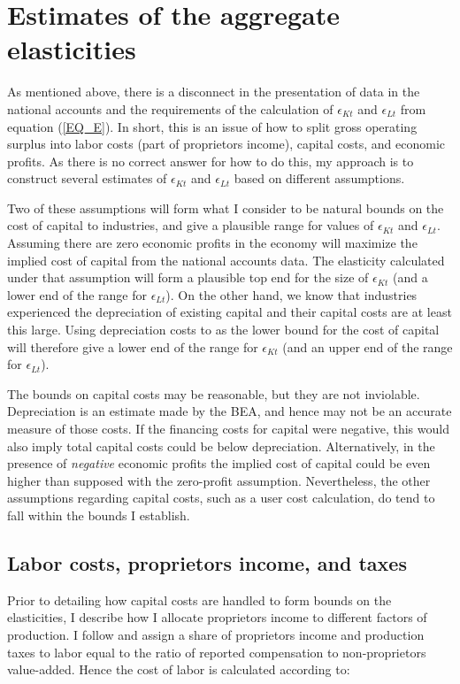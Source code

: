\documentclass[11pt]{article}
\begin{document}
\section{Estimates of the aggregate elasticities}\label{SEC_bounding}
As mentioned above, there is a disconnect in the presentation of data in the national accounts and the requirements of the calculation of $\epsilon_{Kt}$ and $\epsilon_{Lt}$ from equation (\ref{EQ_E}). In short, this is an issue of how to split gross operating surplus into labor costs (part of proprietors income), capital costs, and economic profits. As there is no correct answer for how to do this, my approach is to construct several estimates of $\epsilon_{Kt}$ and $\epsilon_{Lt}$ based on different assumptions.

Two of these assumptions will form what I consider to be natural bounds on the cost of capital to industries, and give a plausible range for values of $\epsilon_{Kt}$ and $\epsilon_{Lt}$. Assuming there are zero economic profits in the economy will maximize the implied cost of capital from the national accounts data. The elasticity calculated under that assumption will form a plausible top end for the size of $\epsilon_{Kt}$ (and a lower end of the range for $\epsilon_{Lt}$). On the other hand, we know that industries experienced the depreciation of existing capital and their capital costs are at least this large. Using depreciation costs to as the lower bound for the cost of capital will therefore give a lower end of the range for $\epsilon_{Kt}$ (and an upper end of the range for $\epsilon_{Lt}$). 

The bounds on capital costs may be reasonable, but they are not inviolable. Depreciation is an estimate made by the BEA, and hence may not be an accurate measure of those costs. If the financing costs for capital were negative, this would also imply total capital costs could be below depreciation. Alternatively, in the presence of \textit{negative} economic profits the implied cost of capital could be even higher than supposed with the zero-profit assumption. Nevertheless, the other assumptions regarding capital costs, such as a user cost calculation, do tend to fall within the bounds I establish.

\subsection{Labor costs, proprietors income, and taxes}
Prior to detailing how capital costs are handled to form bounds on the elasticities, I describe how I allocate proprietors income to different factors of production. I follow \cite{gommerupert2004} and assign a share of proprietors income and production taxes to labor equal to the ratio of reported compensation to non-proprietors value-added. Hence the cost of labor is calculated according to:
\end{document}
